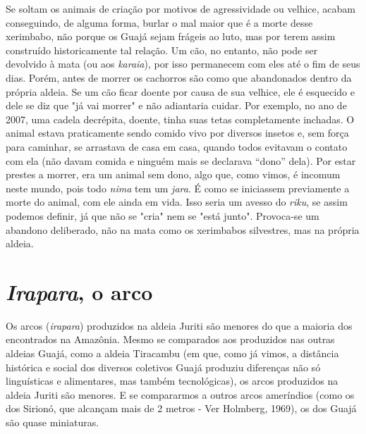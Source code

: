 Se soltam os animais de criação por motivos de agressividade ou velhice,
acabam conseguindo, de alguma forma, burlar o mal maior que é a morte
desse xerimbabo, não porque os Guajá sejam frágeis ao luto, mas por
terem assim construído historicamente tal relação. Um cão, no entanto,
não pode ser devolvido à mata (ou aos \emph{karaia}), por isso
permanecem com eles até o fim de seus dias. Porém, antes de morrer os
cachorros são como que abandonados dentro da própria aldeia. Se um cão
ficar doente por causa de sua velhice, ele é esquecido e dele se diz que
"já vai morrer" e não adiantaria cuidar. Por exemplo, no ano de 2007,
uma cadela decrépita, doente, tinha suas tetas completamente inchadas. O
animal estava praticamente sendo comido vivo por diversos insetos e, sem
força para caminhar, se arrastava de casa em casa, quando todos evitavam
o contato com ela (não davam comida e ninguém mais se declarava ``dono''
dela). Por estar prestes a morrer, era um animal sem dono, algo que,
como vimos, é incomum neste mundo, pois todo \emph{nima} tem um
\emph{jara}. É como se iniciassem previamente a morte do animal, com ele
ainda em vida. Isso seria um avesso do \emph{riku}, se assim podemos
definir, já que não se "cria" nem se "está junto". Provoca-se um
abandono deliberado, não na mata como os xerimbabos silvestres, mas na
própria aldeia.

\section{\emph{Irapara}, o arco}\label{irapara-o-arco}

Os arcos (\emph{irapara}) produzidos na aldeia Juriti são menores do que
a maioria dos encontrados na Amazônia. Mesmo se comparados aos
produzidos nas outras aldeias Guajá, como a aldeia Tiracambu (em que,
como já vimos, a distância histórica e social dos diversos coletivos
Guajá produziu diferenças não só linguísticas e alimentares, mas também
tecnológicas), os arcos produzidos na aldeia Juriti são menores. E se
compararmos a outros arcos ameríndios (como os dos Sirionó, que alcançam
mais de 2 metros - Ver Holmberg, 1969), os dos Guajá são quase
miniaturas.

